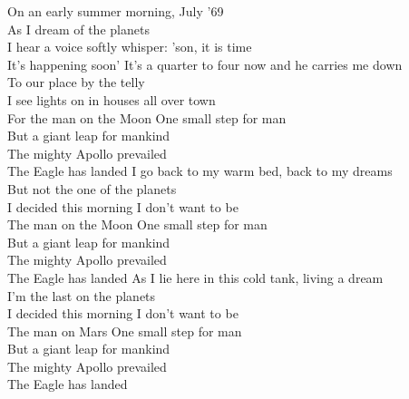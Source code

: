 
On an early summer morning, July '69\\
As I dream of the planets\\
I hear a voice softly whisper: 'son, it is time\\
It's happening soon'
\hop
It's a quarter to four now and he carries me down\\
To our place by the telly\\
I see lights on in houses all over town\\
For the man on the Moon
\hops
{} One small step for man\\
 But a giant leap for mankind\\
 The mighty Apollo prevailed\\
 The Eagle has landed
\hops
I go back to my warm bed, back to my dreams\\
But not the one of the planets\\
I decided this morning I don't want to be\\
The man on the Moon
\hops
{} One small step for man\\
 But a giant leap for mankind\\
 The mighty Apollo prevailed\\
 The Eagle has landed
\hops
As I lie here in this cold tank, living a dream\\
I'm the last on the planets\\
I decided this morning I don't want to be\\
The man on Mars
\hops
{} One small step for man\\
 But a giant leap for mankind\\
 The mighty Apollo prevailed\\
 The Eagle has landed

\clearpage
{}

